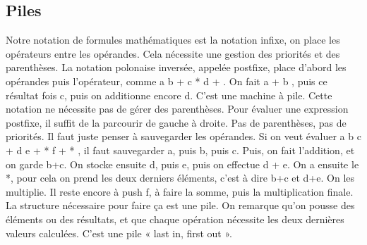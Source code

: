 \documentclass[10pt]{article}
\begin{document}
\subsection{Piles}
Notre notation de formules mathématiques est la notation infixe, on place les opérateurs entre les opérandes. Cela nécessite une gestion des priorités et des parenthèses.  
\newline \newline 
La notation polonaise inversée, appelée postfixe, place d'abord les opérandes puis l'opérateur, comme a b + c * d + . On fait a + b , puis ce résultat fois c, puis on additionne encore d. C'est une machine à pile. Cette notation ne nécessite pas de gérer des parenthèses. 
\newline \newline 
Pour évaluer une expression postfixe, il suffit de la parcourir de gauche à droite. Pas de parenthèses, pas de priorités. Il faut juste penser à sauvegarder les opérandes. Si on veut évaluer a b c + d e + * f + * , il faut sauvegarder a, puis b, puis c. Puis, on fait l'addition, et on garde b+c. On stocke ensuite d, puis e, puis on effectue d + e. 
\newline \newline 
On a ensuite le *, pour cela on prend les deux derniers éléments, c'est à dire b+c et d+e. On les multiplie. Il reste encore à push f, à faire la somme, puis la multiplication finale. 
\newline \newline 
La structure nécessaire pour faire ça est une pile. On remarque qu'on pousse des éléments ou des résultats, et que chaque opération nécessite les deux dernières valeurs calculées. C'est une pile « last in, first out ».
\end{document}
